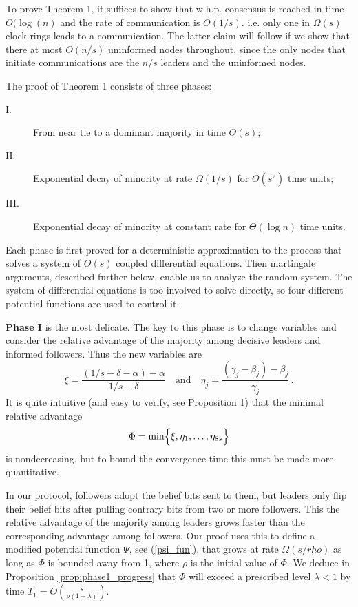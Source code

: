 \documentclass[a4paper,12pt]{article}
\begin{document}
To prove Theorem 1, it suffices to show that w.h.p. consensus is reached in time $O(\log(n)$ and the rate of communication is $O(1/s)$. i.e. only one in $\Omega(s)$ clock rings leads to a communication. The latter claim will follow if we show that there at most $O(n/s)$ uninformed nodes throughout, since the only nodes that initiate communications are the $n/s$ leaders and the uninformed nodes.

\medskip

The proof of Theorem 1 consists of three phases:
\begin{description} 
\item[I.]	From near tie to a dominant majority in time $\Theta(s)$;
\item[II.]	Exponential decay of minority at rate $\Omega(1/s)$ for $\Theta(s^2)$ time units;
\item[III.]	Exponential decay of minority at constant rate for $\Theta(\log n)$ time units.
\end{description}
Each phase is first proved for a deterministic approximation to the process that solves a system of $\Theta(s)$ coupled differential equations. Then martingale arguments, described further below, enable us to analyze the random system.
The system of differential equations is too involved to solve directly, so four different potential functions are used to control it.

\medskip

{\bf Phase I} is the most delicate. The key to this phase is to change variables and consider the relative advantage of the majority among decisive leaders and informed followers. Thus the new variables are 
$$\xi=\frac{\left(1/s-\delta-\alpha\right)-\alpha}{1/s-\delta} \quad \text{and} \quad 
\eta_j=\frac{(\gamma_j-\beta_j)-\beta_j}{\gamma_j} \,.
$$
It is quite intuitive (and easy to verify, see Proposition 1) that the minimal relative advantage
$$ \Phi = \min\Bigl\{  \xi, \eta_1, \ldots, \eta_{8s} \Bigr\}$$
is nondecreasing, but to bound the convergence time this must be made more quantitative. 

In our protocol, followers adopt the belief bits sent to them, but leaders only flip their belief bits after pulling contrary bits from two or more followers. This the relative advantage of the majority among leaders grows faster than the corresponding advantage among followers. Our proof uses this to define a modified potential function $\Psi$, see (\ref {psi_fun}), that grows at rate $\Omega(s/rho)$ as long as $\Phi$ is bounded away from 1, where $\rho$ is the initial value of $\Phi$. We deduce in Proposition \ref{prop:phase1_progress} that $\Phi$ will exceed a prescribed level $\lambda<1$ by time $T_1=O\left(\frac{s}{\rho(1-\lambda)}\right)$. 
	
\end{document}

